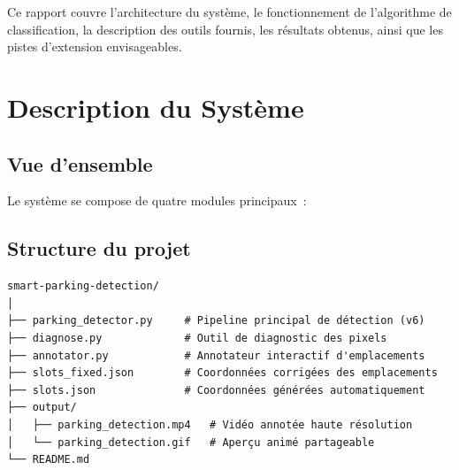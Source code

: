 \documentclass[12pt,a4paper]{report}
\begin{document}
Ce rapport couvre l'architecture du système, le fonctionnement de l'algorithme de classification, la description des outils fournis, les résultats obtenus, ainsi que les pistes d'extension envisageables.

\chapter{Description du Système}

\section{Vue d'ensemble}

Le système se compose de quatre modules principaux~:

\begin{center}
\end{center}

\vspace{0.5em}

\section{Structure du projet}

\begin{tcolorbox}[colback=gray!5, colframe=gray!40, title={Arborescence des fichiers}, fonttitle=\small\bfseries]
\begin{verbatim}
smart-parking-detection/
│
├── parking_detector.py     # Pipeline principal de détection (v6)
├── diagnose.py             # Outil de diagnostic des pixels
├── annotator.py            # Annotateur interactif d'emplacements
├── slots_fixed.json        # Coordonnées corrigées des emplacements
├── slots.json              # Coordonnées générées automatiquement
├── output/
│   ├── parking_detection.mp4   # Vidéo annotée haute résolution
│   └── parking_detection.gif   # Aperçu animé partageable
└── README.md
\end{verbatim}
\end{tcolorbox}
\end{document}
